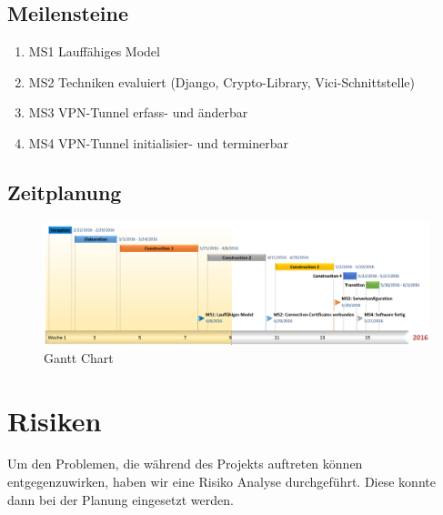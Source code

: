 \begin{landscape}
\subsection{Meilensteine}
\begin{enumerate}
	\item MS1 Lauffähiges Model
	\item MS2 Techniken evaluiert (Django, Crypto-Library, Vici-Schnittstelle)
	\item MS3 VPN-Tunnel erfass- und änderbar
	\item MS4 VPN-Tunnel initialisier- und terminerbar
\end{enumerate}
\subsection{Zeitplanung}
	\begin{figure}[H]
		\centering
		\includegraphics[width=250mm]{images/gantt.PNG}
		\caption{Gantt Chart}
	\end{figure}
\newpage
\section{Risiken}
Um den Problemen, die während des Projekts auftreten können entgegenzuwirken, haben wir eine Risiko Analyse durchgeführt. Diese konnte dann bei der Planung eingesetzt werden.


\end{landscape}
